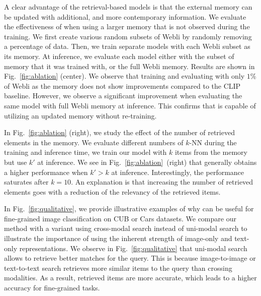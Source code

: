 A clear advantage of the retrieval-based models is that the external memory can be updated with additional, and more contemporary information.
We evaluate the effectiveness of \OURS when using a larger memory that is not observed during the training.
We first create various random subsets of Webli by randomly removing a percentage of data.
Then, we train separate \OURS models with each Webli subset as its memory.
At inference, we evaluate each \OURS model either with the subset of memory that it was trained with, or the full Webli memory.
Results are shown in Fig.~\ref{fig:ablation} (center).
We observe that training and evaluating \OURS with only $1\%$ of Webli as the memory does not show improvements compared to the CLIP baseline.
However, we observe a significant improvement when evaluating the same model with full Webli memory at inference.
This confirms that \OURS is capable of utilizing an updated memory without re-training.


In Fig.~\ref{fig:ablation} (right), we study the effect of the number of retrieved elements in the memory.
We evaluate different numbers of $k$-NN during the training and inference time, \ie we train our model with $k$ items from the memory but use $k'$ at inference.
We see in Fig.~\ref{fig:ablation}~(right) that \OURS generally obtains a higher performance when $k' > k$ at inference.
Interestingly, the performance saturates after $k=10$.
An explanation is that increasing the number of retrieved elements goes with a reduction of the relevancy of the retrieved items.


In Fig.~\ref{fig:qualitative}, we provide illustrative examples of why \OURS can be useful for fine-grained image classification on CUB or Cars datasets.
We compare our method with a variant using cross-modal search instead of uni-modal search to illustrate the importance of using the inherent strength of image-only and text-only representations.
We observe in Fig.~\ref{fig:qualitative} that uni-modal search allows to retrieve better matches for the query.
This is because image-to-image or text-to-text search retrieves more similar items to the query than crossing modalities.
As a result, retrieved items are more accurate, which leads to a higher accuracy for fine-grained tasks.


